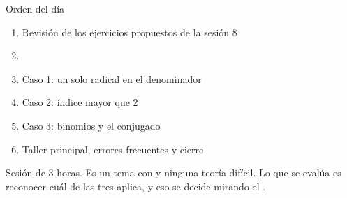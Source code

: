 \documentclass[aspectratio=169,10pt]{beamer}
\begin{document}
\portada

\begin{frame}{Orden del día}
  \begin{enumerate}
    \item Revisión de los ejercicios propuestos de la sesión 8
    \item {}
    \item Caso 1: un solo radical en el denominador
    \item Caso 2: índice mayor que 2
    \item Caso 3: binomios y el conjugado
    \item Taller principal, errores frecuentes y cierre
  \end{enumerate}

  \vspace{0.25cm}
  {\footnotesize\color{uniGris} Sesión de 3 horas. Es un tema con
   y ninguna teoría difícil. Lo que se evalúa es
  reconocer cuál de las tres aplica, y eso se decide mirando el
  .}
\end{frame}

\end{document}
